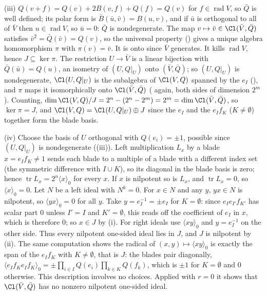 (iii) $Q(v + f) = Q(v) + 2B(v, f) + Q(f) = Q(v)$ for $f \in \operatorname{rad} V$, so $\bar Q$ is well defined; its polar form is $\bar B(\bar u, \bar v) = B(u, v)$, and if $\bar u$ is orthogonal to all of $\bar V$ then $u \in \operatorname{rad} V$, so $\bar u = 0$: $\bar Q$ is nondegenerate. The map $v \mapsto \bar v \in \Cl(\bar V, \bar Q)$ satisfies $\bar v^{2} = \bar Q(\bar v) = Q(v)$, so the universal property () gives a unique algebra homomorphism $\pi$ with $\pi(v) = \bar v$. It is onto since $\bar V$ generates. It kills $\operatorname{rad} V$, hence $J \subseteq \ker \pi$. The restriction $U \to \bar V$ is a linear bijection with $\bar Q(\bar u) = Q(u)$, an isometry of $(U, Q|_U)$ onto $(\bar V, \bar Q)$; so $(U, Q|_U)$ is nondegenerate, $\Cl(U, Q|_U)$ is the subalgebra of $\Cl(V, Q)$ spanned by the $e_I$ (), and $\pi$ maps it isomorphically onto $\Cl(\bar V, \bar Q)$ ( again, both sides of dimension $2^{m}$). Counting, $\dim \Cl(V, Q)/J = 2^{n} - (2^{n} - 2^{m}) = 2^{m} = \dim \Cl(\bar V, \bar Q)$, so $\ker \pi = J$, and $\Cl(V, Q) = \Cl(U, Q|_U) \oplus J$ since the $e_I$ and the $e_I f_K$ ($K \ne \emptyset$) together form the blade basis.

(iv) Choose the basis of $U$ orthogonal with $Q(e_i) = \pm 1$, possible since $(U, Q|_U)$ is nondegenerate ((iii)). Left multiplication $L_x$ by a blade $x = e_I f_K \ne 1$ sends each blade to a multiple of a blade with a different index set (the symmetric difference with $I \cup K$), so its diagonal in the blade basis is zero; hence $\operatorname{tr} L_x = 2^{n} \langle x \rangle_0$ for every $x$. If $x$ is nilpotent so is $L_x$, and $\operatorname{tr} L_x = 0$, so $\langle x \rangle_0 = 0$. Let $N$ be a left ideal with $N^{k} = 0$. For $x \in N$ and any $y$, $yx \in N$ is nilpotent, so $\langle y x \rangle_0 = 0$ for all $y$. Take $y = e_I^{-1} = \pm e_I$ for $K = \emptyset$: since $e_I e_{I'} f_{K'}$ has scalar part $0$ unless $I' = I$ and $K' = \emptyset$, this reads off the coefficient of $e_I$ in $x$, which is therefore $0$; so $x \in J$ by (i). For right ideals use $\langle x y \rangle_0$ and $y = e_I^{-1}$ on the other side. Thus every nilpotent one-sided ideal lies in $J$, and $J$ is nilpotent by (ii). The same computation shows the radical of $(x, y) \mapsto \langle xy \rangle_0$ is exactly the span of the $e_I f_K$ with $K \ne \emptyset$, that is $J$: the blades pair diagonally, $\langle e_I f_K e_I f_K \rangle_0 = \pm\prod_{i \in I} Q(e_i) \prod_{k \in K} Q(f_k)$, which is $\pm 1$ for $K = \emptyset$ and $0$ otherwise. This description involves no choices. Applied with $r = 0$ it shows that $\Cl(\bar V, \bar Q)$ has no nonzero nilpotent one-sided ideal.

